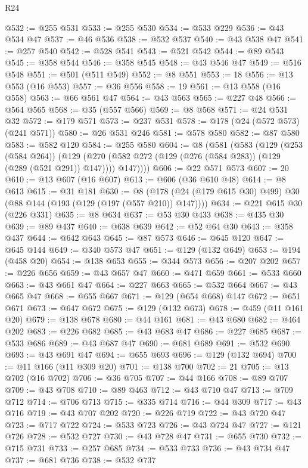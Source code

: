 \begin{lexlean}{R24}
\begin{coremodule}
@532 := @255 @531
@533 := @255 @530
@534 := @533 @229
@536 := @43 @534 @47
@537 := @46 @536
@538 := @532 @537
@540 := @43 @538 @47
@541 := @257 @540
@542 := @528 @541
@543 := @521 @542
@544 := @89 @543
@545 := @358 @544
@546 := @358 @545
@548 := @43 @546 @47
@549 := @516 @548
@551 := @501 (@511 @549)
@552 := @8 @551
@553 := 18
@556 := @13 @553 (@16 @553)
@557 := @36 @556
@558 := 19
@561 := @13 @558 (@16 @558)
@563 := @66 @561 @47
@564 := @43 @563
@565 := @227 @48
@566 := @564 @565
@568 := @35 (@557 @566)
@569 := @8 @568
@571 := @24 @531 @32
@572 := @179 @571
@573 := @237 @531
@578 := @178 (@24 (@572 @573) (@241 @571))
@580 := @26 @531 @246
@581 := @578 @580
@582 := @87 @580
@583 := @582 @120
@584 := @255 @580
@604 := @8
    (@581
      (@583
        (@129
          (@253 (@584 @264))
          (@129 (@270 (@582 @272 (@129 (@276 (@584 @283)) (@129 (@289 (@521 @291)) @147)))) @147))))
@606 := @22 @571 @573
@607 := 20
@610 := @13 @607 (@16 @607)
@613 := @606 (@36 @610 @48)
@614 := @8 @613
@615 := @31 @181
@630 := @8 (@178 (@24 (@179 @615 @30) @499) @30 (@88 @144 (@193 (@129 (@197 (@557 @210)) @147))))
@634 := @221 @615 @30 (@226 @331)
@635 := @8 @634
@637 := @53 @30 @433
@638 := @435 @30
@639 := @89 @437
@640 := @638 @639
@642 := @52 @64 @30
@643 := @358 @437
@644 := @642 @643
@645 := @87 @573
@646 := @645 @120
@647 := @645 @144
@649 := @340 @573 @47
@651 := @129 (@132 @649)
@653 := @194 (@458 @20)
@654 := @138 @653
@655 := @344 @573
@656 := @207 @202
@657 := @226 @656
@659 := @43 @657 @47
@660 := @471 @659
@661 := @533 @660
@663 := @43 @661 @47
@664 := @227 @663
@665 := @532 @664
@667 := @43 @665 @47
@668 := @655 @667
@671 := @129 (@654 @668) @147
@672 := @651 @671
@673 := @647 @672
@675 := @129 (@132 @673)
@678 := @459 (@11 @161 @20)
@679 := @138 @678
@680 := @44 @161
@681 := @43 @680
@682 := @464 @202
@683 := @226 @682
@685 := @43 @683 @47
@686 := @227 @685
@687 := @533 @686
@689 := @43 @687 @47
@690 := @681 @689
@691 := @532 @690
@693 := @43 @691 @47
@694 := @655 @693
@696 := @129 (@132 @694)
@700 := @11 @166 (@11 @309 @20)
@701 := @138 @700
@702 := 21
@705 := @13 @702 (@16 @702)
@706 := @36 @705
@707 := @44 @166
@708 := @89 @707
@709 := @43 @708
@710 := @89 @463
@712 := @43 @710 @47
@713 := @709 @712
@714 := @706 @713
@715 := @335 @714
@716 := @44 @309
@717 := @43 @716
@719 := @43 @707 @202
@720 := @226 @719
@722 := @43 @720 @47
@723 := @717 @722
@724 := @533 @723
@726 := @43 @724 @47
@727 := @121 @726
@728 := @532 @727
@730 := @43 @728 @47
@731 := @655 @730
@732 := @715 @731
@733 := @257 @685
@734 := @533 @733
@736 := @43 @734 @47
@737 := @681 @736
@738 := @532 @737

\end{coremodule}
\end{lexlean}
